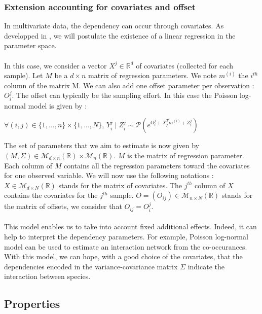 \documentclass[11pt, a4paper]{article}
\begin{document}
\subsubsection{Extension accounting for covariates and offset}
In multivariate data, the dependency can occur through covariates. As developped in \cite{chiquet2017variational}, we will postulate the existence of a linear regression in  the parameter space. \\
\\
In this case, we consider a vector $X^j \in \mathbb{R}^d$ of covariates (collected for each sample). Let $M$ be a $d \times n$ matrix of regression parameters. We note $m^{(i)}$ the $i^{th}$ column of the matrix M. We can also add one offset parameter per observation : $O^j_i$. The offset can typically be the sampling effort. In this case the Poisson log-normal model is given by :
\begin{center}
$\forall (i,j) \in \{1,...,n\} \times \{1,...,N\}$, $Y^j_i \mid Z^j_i \sim \mathcal{P}(e^{O^j_i + X_j^T m^{(i)} +Z^j_i})$ 
\end{center}
The set of parameters that we aim to estimate is now given by $(M,\Sigma) \in \mathcal{M}_{d \times n}(\mathbb{R}) \times \mathcal{M}_{n}(\mathbb{R})$. $M$ is the matrix of regression parameter. Each column of $M$ contains all the regression parameters toward the covariates for one observed variable. We will now use the following notations : $X \in \mathcal{M}_{d \times N} ( \mathbb{R})$ stands for the matrix of covariates. The $j^{th}$ column of $X$ contains the covariates for the $j^{th}$ sample. $O =(O_{ij}) \in \mathcal{M}_{n \times N} (\mathbb{R})$ stands for the matrix of offsets, we consider that $O_{ij}=O^j_i$. \\
\\
This model enables us to take into account fixed additional effects. Indeed, it can help to interpret the dependency parameters. For example, 	Poisson log-normal model can be used to estimate an interaction network from the co-occurances. With this model, we can hope, with a good choice of the covariates, that the dependencies encoded in the variance-covariance matrix $\Sigma$ indicate the interaction between species.
\subsection{Properties}
\end{document}
